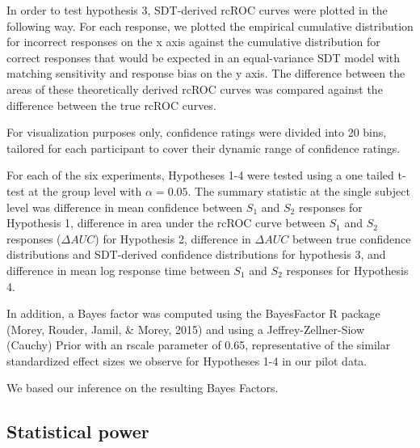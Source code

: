 \documentclass[12pt,twoside]{reedthesis}
\begin{document}
In order to test hypothesis 3, SDT-derived rcROC curves were plotted in the following way. For each response, we plotted the empirical cumulative distribution for incorrect responses on the x axis against the cumulative distribution for correct responses that would be expected in an equal-variance SDT model with matching sensitivity and response bias on the y axis. The difference between the areas of these theoretically derived rcROC curves was compared against the difference between the true rcROC curves.

For visualization purposes only, confidence ratings were divided into 20 bins, tailored for each participant to cover their dynamic range of confidence ratings.

For each of the six experiments, Hypotheses 1-4 were tested using a one tailed t-test at the group level with \(\alpha=0.05\). The summary statistic at the single subject level was difference in mean confidence between \(S_1\) and \(S_2\) responses for Hypothesis 1, difference in area under the rcROC curve between \(S_1\) and \(S_2\) responses (\(\Delta AUC\)) for Hypothesis 2, difference in \(\Delta AUC\) between true confidence distributions and SDT-derived confidence distributions for hypothesis 3, and difference in mean log response time between \(S_1\) and \(S_2\) responses for Hypothesis 4.

In addition, a Bayes factor was computed using the BayesFactor R package (Morey, Rouder, Jamil, \& Morey, 2015) and using a Jeffrey-Zellner-Siow (Cauchy) Prior with an rscale parameter of 0.65, representative of the similar standardized effect sizes we observe for Hypotheses 1-4 in our pilot data.

We based our inference on the resulting Bayes Factors.

\hypertarget{statistical-power}{%
\subsection{Statistical power}\label{statistical-power}}
\end{document}
